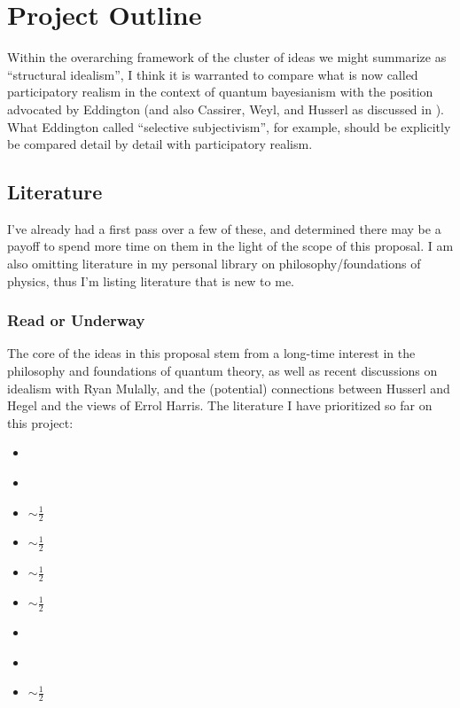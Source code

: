\section{Project Outline}




Within the overarching framework of the cluster of ideas we might summarize as ``structural idealism'', I think it is warranted to compare what is now called participatory realism in the context of quantum bayesianism with the position advocated by Eddington (and also Cassirer, Weyl, and Husserl as discussed in \cite{Ryckman2005}).  What Eddington called ``selective subjectivism'', for example, should be explicitly be compared detail by detail with participatory realism. 


\subsection{Literature}

I've already had a first pass over a few of these, and determined there may be a payoff to spend more time on them in the light of the scope of this proposal.  I am also omitting literature in my personal library on philosophy/foundations of physics, thus I'm listing literature that is new to me. 

\subsubsection{Read or Underway}

The core of the ideas in this proposal stem from a long-time interest in the philosophy and foundations of quantum theory, as well as recent discussions on idealism with Ryan Mulally, and the (potential) connections between Husserl and Hegel and the views of Errol Harris.  The literature I have prioritized so far on this project:

\begin{itemize}
    \item \cite{Poincare1952} \checkmark
    \item \cite{Eddington1939} \checkmark
    \item \cite{Ryckman2005} $\sim \frac{1}{2}$
    \item \cite{Harris1965} $\sim \frac{1}{2}$
    \item \cite{Weyl1949} $\sim \frac{1}{2}$
    \item \cite{Cassirer1927} $\sim \frac{1}{2}$
    \item \cite{Riezler1940} \checkmark
    \item \cite{Carnap1966} \checkmark
    \item \cite{KantProlegomena} $\sim \frac{1}{2}$
\end{itemize}


